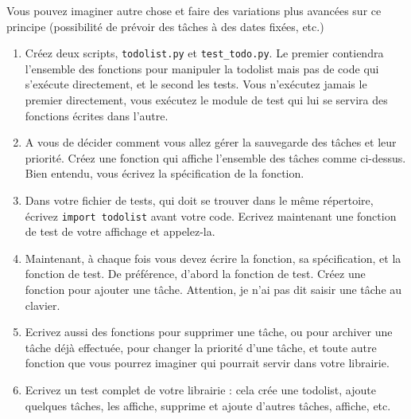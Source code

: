 \documentclass[11pt,a4paper]{article}
\newcommand{\checkbox}{$\square$ \smallskip}
\newcounter{exo} \setcounter{exo}{0}
\newenvironment{action}{%
    \begin{enumerate}[\numerotation] \addtocounter{exo}{-1}%
        }{%
    \end{enumerate}
}
\newcommand{\numexoa}{\theexo \addtocounter{exo}{1}}
\newcommand{\numerotation}{\checkbox \smallskip \numexoa.}
\begin{document}
Vous pouvez imaginer autre chose et faire des variations plus avancées sur ce principe (possibilité de prévoir des tâches à des dates fixées, etc.)

\begin{action}
\item Créez deux scripts, {\tt todolist.py} et {\tt test\_todo.py}. Le premier contiendra l'ensemble des fonctions pour manipuler la todolist mais pas de code qui s'exécute directement, et le second les tests. Vous n'exécutez jamais le premier directement, vous exécutez le module de test qui lui se servira des fonctions écrites dans l'autre.
\item A vous de décider comment vous allez gérer la sauvegarde des tâches et leur priorité. Créez une fonction qui affiche l'ensemble des tâches comme ci-dessus. Bien entendu, vous écrivez la spécification de la fonction.
\item Dans votre fichier de tests, qui doit se trouver dans le même répertoire, écrivez {\tt import todolist} avant votre code. Ecrivez maintenant une fonction de test de votre affichage et appelez-la.
\item Maintenant, à chaque fois vous devez écrire la fonction, sa spécification, et la fonction de test. De préférence, d'abord la fonction de test. Créez une fonction pour ajouter une tâche. Attention, je n'ai pas dit saisir une tâche au clavier.
\item Ecrivez aussi des fonctions pour supprimer une tâche, ou pour archiver une tâche déjà effectuée, pour changer la priorité d'une tâche, et toute autre fonction que vous pourrez imaginer qui pourrait servir dans votre librairie.

\item Ecrivez un test complet de votre librairie : cela crée une todolist, ajoute quelques tâches, les affiche, supprime et ajoute d'autres tâches, affiche, etc.
\end{action}
\end{document}
